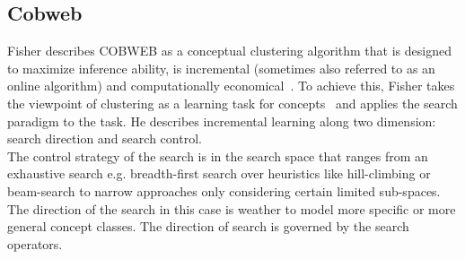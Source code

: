 \subsection{Cobweb}\label{\positionnumber}
Fisher describes COBWEB as a conceptual clustering algorithm that is designed to maximize inference ability, is incremental (sometimes also referred to as an online algorithm) and computationally economical~\cite{Fisher1987}. To achieve this, Fisher takes the viewpoint of clustering as a learning task for concepts~\cite{mitchell1982generalization} and applies the search paradigm to the task. He describes incremental learning along two dimension: search direction and search control. \\
The control strategy of the search is in the search space that ranges from an exhaustive search e.g. breadth-first search over heuristics like hill-climbing or beam-search to narrow approaches only considering certain limited sub-spaces. \\

The direction of the search in this case is weather to model more specific or more general concept classes. The direction of search is governed by the search operators. \\

